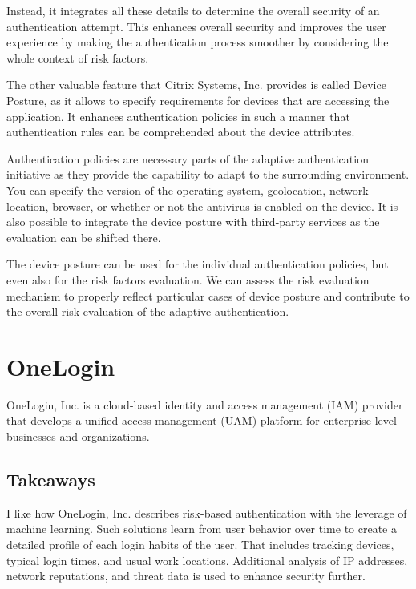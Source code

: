 Instead, it integrates all these details to determine the overall security of an authentication attempt.
This enhances overall security and improves the user experience by making the authentication process smoother by considering the whole context of risk factors.

The other valuable feature that Citrix Systems, Inc. provides is called Device Posture, as it allows to specify requirements for devices that are accessing the application. 
It enhances authentication policies in such a manner that authentication rules can be comprehended about the device attributes.

Authentication policies are necessary parts of the adaptive authentication initiative as they provide the capability to adapt to the surrounding environment.
You can specify the version of the operating system, geolocation, network location, browser, or whether or not the antivirus is enabled on the device.
It is also possible to integrate the device posture with third-party services as the evaluation can be shifted there.

The device posture can be used for the individual authentication policies, but even also for the risk factors evaluation.
We can assess the risk evaluation mechanism to properly reflect particular cases of device posture and contribute to the overall risk evaluation of the adaptive authentication.\cite{existing-citrix-device-posture}

\newpage
\section{OneLogin}

OneLogin, Inc. is a cloud-based identity and access management (IAM) provider that develops a unified access management (UAM) platform for enterprise-level businesses and organizations. \cite{existing-onelogin}

\subsection*{Takeaways}
I like how OneLogin, Inc. describes risk-based authentication with the leverage of machine learning. 
Such solutions learn from user behavior over time to create a detailed profile of each login habits of the user.
That includes tracking devices, typical login times, and usual work locations.
Additional analysis of IP addresses, network reputations, and threat data is used to enhance security further.

